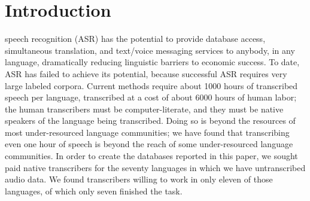 \section{Introduction}

 speech recognition (ASR) has the potential to provide
database access, simultaneous translation, and text/voice messaging
services to anybody, in any language, dramatically reducing linguistic
barriers to economic success.  To date, ASR has failed to achieve its
potential, because successful ASR requires very large labeled
corpora. Current methods require about 1000 hours of transcribed
speech per language, transcribed at a cost of about 6000 hours of
human labor; the human transcribers must be computer-literate, and
they must be native speakers of the language being transcribed.
Doing so is beyond the resources of most under-resourced language
communities; we have found that transcribing even one hour of speech
is beyond the reach of some under-resourced language communities.
In order to create the databases reported in this paper, we sought
paid native transcribers for the seventy languages in which we have
untranscribed audio data.  We found transcribers willing to work in
only eleven of those languages, of which only seven finished the task.

